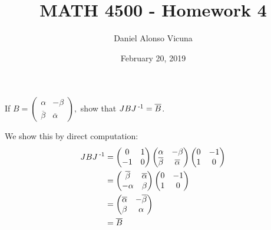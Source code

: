 \documentclass[11pt,onecolumn]{article}
\title{MATH 4500 - Homework 4}
\author{Daniel Alonso Vicuna}
\date{February 20, 2019}
\newcommand{\nn}{_{2n}}
\begin{document}
\maketitle
\begin{comment}
For this problem set, we will let $$ J = \begin{pmatrix} 0& 1 \\ -1 & 0\end{pmatrix} \qquad  J\nn = \begin{pmatrix} J & 0 & 0 & ... & 0 \\ 0 & J & 0 & ... & 0 \\ .. & .. & .. & .. & .. \\ 0 & 0 & 0 & ... & J\end{pmatrix} $$
\end{comment}
\begin{exercise}
If $B  = \begin{pmatrix}
\alpha & -\beta \\ \overline{\beta} & \overline{\alpha} \end{pmatrix},$ show that $JBJ\operatorname{^{-1}} = \overline{B}$.
\end{exercise}
\begin{answer}
We show this by direct computation:
\begin{align*}
    JBJ\operatorname{^{-1}} &= \begin{pmatrix} 0& 1 \\ -1 & 0\end{pmatrix} \begin{pmatrix} \alpha & -\beta \\ \overline{\beta} & \overline{\alpha} \end{pmatrix} \begin{pmatrix} 0& -1 \\ 1 & 0\end{pmatrix} \\
    &= \begin{pmatrix} \overline{\beta} & \overline{\alpha} \\ -\alpha & \beta \end{pmatrix}\begin{pmatrix} 0& -1 \\ 1 & 0\end{pmatrix} \\
    &= \begin{pmatrix}\overline{\alpha} & -\overline{\beta} \\ \beta & \alpha \end{pmatrix} \\
    &= \overline{B}
\end{align*}
\end{answer}
\end{document}
